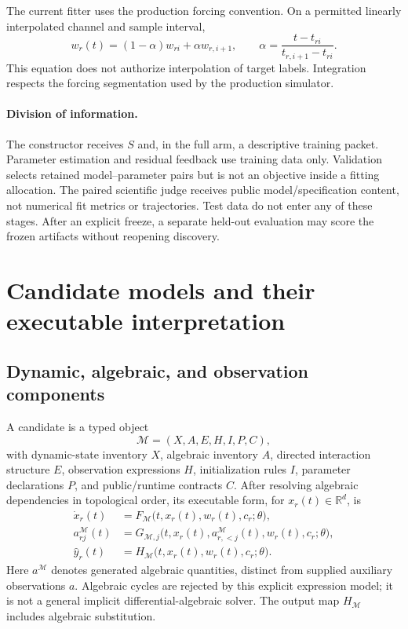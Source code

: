 \documentclass[11pt]{article}
\newcommand{\R}{\mathbb{R}}
\newcommand{\M}{\mathcal{M}}
\begin{document}
The current fitter uses the production forcing convention. On a permitted
linearly interpolated channel and sample interval,
\begin{equation}
 w_r(t)=(1-\alpha)w_{ri}+\alpha w_{r,i+1},\qquad
 \alpha=\frac{t-t_{ri}}{t_{r,i+1}-t_{ri}}.
 \label{eq:forcing}
\end{equation}
This equation does not authorize interpolation of target labels. Integration
respects the forcing segmentation used by the production simulator.

\paragraph{Division of information.}
The constructor receives $S$ and, in the full arm, a descriptive training packet.
Parameter estimation and residual feedback use training data only. Validation
selects retained model--parameter pairs but is not an objective inside a fitting
allocation. The paired scientific judge receives public model/specification
content, not numerical fit metrics or trajectories. Test data do not enter any
of these stages. After an explicit freeze, a separate held-out evaluation may
score the frozen artifacts without reopening discovery.

\section{Candidate models and their executable interpretation}
\label{sec:model}

\subsection{Dynamic, algebraic, and observation components}
A candidate is a typed object
\begin{equation}
 \M=(X,A,E,H,I,P,C),
\end{equation}
with dynamic-state inventory $X$, algebraic inventory $A$, directed interaction
structure $E$, observation expressions $H$, initialization rules $I$, parameter
declarations $P$, and public/runtime contracts $C$. After resolving algebraic
dependencies in topological order, its executable form, for $x_r(t)\in\R^d$, is
\begin{align}
 \dot x_r(t)&=F_{\M}\bigl(t,x_r(t),w_r(t),c_r;\theta\bigr),\\
 a^{\M}_{rj}(t)&=G_{\M,j}
   \bigl(t,x_r(t),a^{\M}_{r,<j}(t),w_r(t),c_r;\theta\bigr),\\
 \widehat y_r(t)&=H_{\M}\bigl(t,x_r(t),w_r(t),c_r;\theta\bigr).
 \label{eq:model}
\end{align}
Here $a^{\M}$ denotes generated algebraic quantities, distinct from supplied
auxiliary observations $a$. Algebraic cycles are rejected by this explicit
expression model; it is not a general implicit differential-algebraic solver.
The output map $H_{\M}$ includes algebraic substitution.
\end{document}
